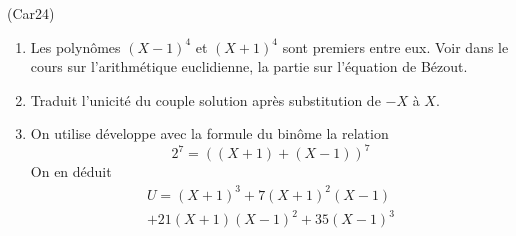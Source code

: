 \begin{tiny}(Car24)\end{tiny} 
\begin{enumerate}
  \item  Les polynômes $(X-1)^4$ et $(X+1)^4$ sont premiers entre eux. Voir dans le cours sur l'arithmétique euclidienne, la partie sur l'équation de Bézout.
  \item Traduit l'unicité du couple solution après substitution de $-X$ à $X$.
  \item  On utilise développe avec la formule du binôme la relation
\begin{displaymath}
 2^7 = \left( (X+1) + (X-1)\right)^7 
\end{displaymath}
On en déduit
\begin{multline*}
 U = (X+1)^3 + 7(X+1)^2(X-1)  \\ + 21(X+1)(X-1)^2 +35(X-1)^3
\end{multline*}
\end{enumerate}

 